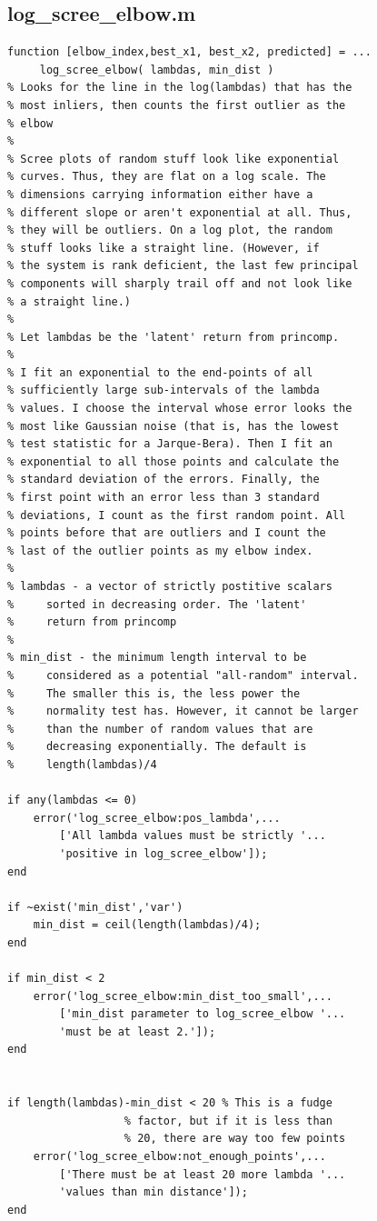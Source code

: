 \documentclass[10pt,letterpaper]{book}
\begin{document}
\subsection{log\_scree\_elbow.m}
\begin{lstlisting}
function [elbow_index,best_x1, best_x2, predicted] = ...
     log_scree_elbow( lambdas, min_dist )
% Looks for the line in the log(lambdas) that has the
% most inliers, then counts the first outlier as the
% elbow
%
% Scree plots of random stuff look like exponential
% curves. Thus, they are flat on a log scale. The
% dimensions carrying information either have a
% different slope or aren't exponential at all. Thus,
% they will be outliers. On a log plot, the random
% stuff looks like a straight line. (However, if
% the system is rank deficient, the last few principal
% components will sharply trail off and not look like
% a straight line.)
% 
% Let lambdas be the 'latent' return from princomp.
% 
% I fit an exponential to the end-points of all
% sufficiently large sub-intervals of the lambda
% values. I choose the interval whose error looks the
% most like Gaussian noise (that is, has the lowest
% test statistic for a Jarque-Bera). Then I fit an
% exponential to all those points and calculate the
% standard deviation of the errors. Finally, the
% first point with an error less than 3 standard
% deviations, I count as the first random point. All
% points before that are outliers and I count the
% last of the outlier points as my elbow index.
%
% lambdas - a vector of strictly postitive scalars
%     sorted in decreasing order. The 'latent'
%     return from princomp
%
% min_dist - the minimum length interval to be
%     considered as a potential "all-random" interval.
%     The smaller this is, the less power the
%     normality test has. However, it cannot be larger
%     than the number of random values that are
%     decreasing exponentially. The default is
%     length(lambdas)/4

if any(lambdas <= 0)
    error('log_scree_elbow:pos_lambda',...
        ['All lambda values must be strictly '...
        'positive in log_scree_elbow']);
end

if ~exist('min_dist','var')
    min_dist = ceil(length(lambdas)/4);
end

if min_dist < 2
    error('log_scree_elbow:min_dist_too_small',...
        ['min_dist parameter to log_scree_elbow '...
        'must be at least 2.']);
end
        

if length(lambdas)-min_dist < 20 % This is a fudge
                  % factor, but if it is less than 
                  % 20, there are way too few points
    error('log_scree_elbow:not_enough_points',...
        ['There must be at least 20 more lambda '...
        'values than min distance']);
end


\end{lstlisting}
\end{document}
